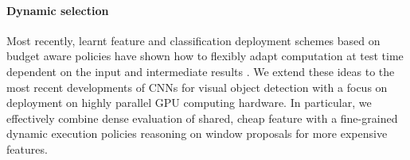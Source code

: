 \paragraph{Dynamic selection}\label{dynamic-selection}
Most recently, learnt feature and classification deployment schemes based on budget aware policies have shown how to flexibly adapt computation at test time dependent on the input and intermediate results \cite{Karayev-NIPS-2012,karayev14cvpr}. We extend these ideas to the most recent developments of CNNs for visual object detection with a focus on deployment on highly parallel GPU computing hardware. In particular, we effectively combine  dense evaluation of shared, cheap feature with a fine-grained dynamic execution policies reasoning on window proposals for more expensive features.

